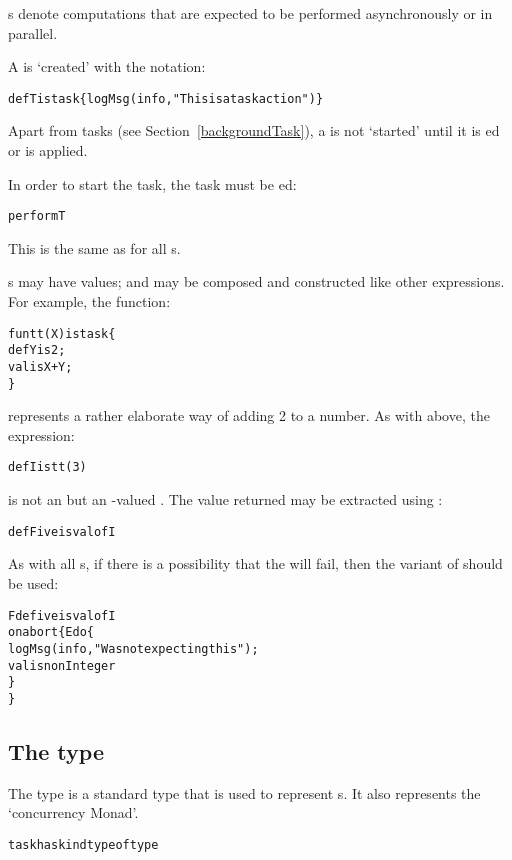 s denote computations that are expected to be performed asynchronously or in parallel.

A  is `created' with the  notation:
\begin{alltt}
def T is task\{ logMsg(info,"This is a task action") \}
\end{alltt}
\begin{aside}
Apart from  tasks (see Section~\vref{backgroundTask}), a  is not `started' until it is ed or  is applied.
\end{aside}
In order to start the task, the task must be ed:
\begin{alltt}
perform T
\end{alltt}
This is the same as for all s.

s may have values; and may be composed and constructed like other expressions. For example, the function:
\begin{alltt}
fun tt(X) is task\{
  def Y is 2;
  valis X+Y;
\}
\end{alltt}
represents a rather elaborate way of adding 2 to a number. As with  above, the expression:
\begin{alltt}
def I is tt(3)
\end{alltt}
is not an  but an -valued . The value returned may be extracted using :
\begin{alltt}
def Five is valof I
\end{alltt}
As with all s, if there is a possibility that the  will fail, then the  variant of  should be used:
\begin{alltt}
Fdef ive is valof I 
  on abort \{ E do \{ 
    logMsg(info,"Was not expecting this");
    valis nonInteger
  \}
\}
\end{alltt}

\subsection{The  type}
\label{taskType}
The  type is a standard type that is used to represent s. It also represents the `concurrency Monad'.

\begin{alltt}
task has kind type of type
\end{alltt}

